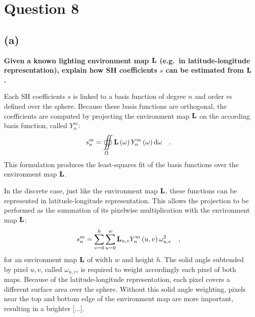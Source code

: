 \documentclass{report}
\begin{document}
\section{Question 8}
\subsection{(a)}
\textbf{Given a known lighting environment map $\mathbf{L}$ (e.g.\ in latitude-longitude representation), explain how SH coefficients $s$ can be estimated from $\mathbf{L}$.}

Each SH coefficients $s$ is linked to a basis function of degree $n$ and order $m$ defined over the sphere. Because these basis functions are orthogonal, the coefficients are computed by projecting the environment map $\mathbf{L}$ on the according basis function, called $Y_n^m$:
\begin{equation}
s_n^m = \oiint\limits_{\Omega} \mathbf{L}\left(\mathbf{\omega} \right) Y_n^m \left( \mathbf{\omega} \right) \mathrm{d} \mathbf{\omega}   \quad.
\end{equation}
This formulation produces the least-squares fit of the basis functions over the environment map $\mathbf{L}$.

In the discrete case, just like the environment map $\mathbf{L}$, these functions can be represented in latitude-longitude representation. This allows the projection to be performed as the summation of its pixelwise multiplication with the environment map $\mathbf{L}$:
\begin{equation}
s_n^m = \sum_{v=0}^{h} \sum_{u=0}^{w} \mathbf{L}_{u,v} Y_n^m\left(u, v\right) \omega_{u,v}^2 \quad,
\end{equation}
for an environment map $\mathbf{L}$ of width $w$ and height $h$. The solid angle subtended by pixel $u,v$, called $\omega_{u,v}$, is required to weight accordingly each pixel of both maps. Because of the latitude-longitude representation, each pixel covers a different surface area over the sphere. Without this solid angle weighting, pixels near the top and bottom edge of the environment map are more important, resulting in a brighter  [...].
\end{document}
